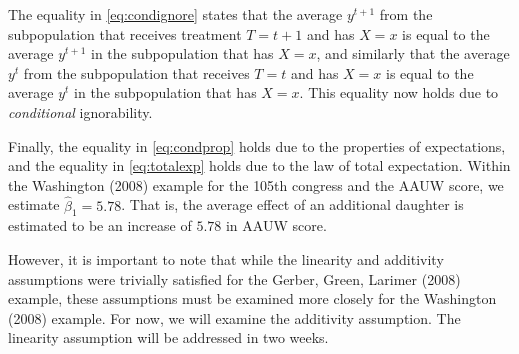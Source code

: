 \documentclass{article}
\begin{document}
The equality in \eqref{eq:condignore} states that the average $y^{t+1}$ from the subpopulation that receives treatment $T=t+1$ and has $X=x$ is equal to the average $y^{t+1}$ in the subpopulation that has $X=x$, and similarly that the average $y^{t}$ from the subpopulation that receives $T=t$ and has $X=x$ is equal to the average $y^{t}$ in the subpopulation that has $X=x$. This equality now holds due to \emph{conditional} ignorability.

Finally, the equality in \eqref{eq:condprop} holds due to the properties of expectations, and the equality in \eqref{eq:totalexp} holds due to the law of total expectation. Within the Washington (2008) example for the 105th congress and the AAUW score, we estimate $\widehat{\beta}_1=5.78$. That is, the average effect of an additional daughter is estimated to be an increase of $5.78$ in AAUW score.

However, it is important to note that while the linearity and additivity assumptions were trivially satisfied for the Gerber, Green, Larimer (2008) example, these assumptions must be examined more closely for the Washington (2008) example. For now, we will examine the additivity assumption. The linearity assumption will be addressed in two weeks. 
\end{document}
